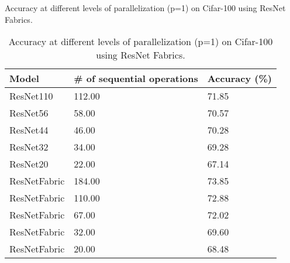\begin{table}[h]
\centering
\caption{Accuracy at different levels of parallelization (p=1) on Cifar-100 using ResNet Fabrics.}
\label{cif100_resnetfab_para1}
\begin{tabular}{|lll|}
\hline
Model        & \# of sequential operations & Accuracy (\%) \\ \hline \hline
ResNet110    & 112.00                      & 71.85         \\
ResNet56     & 58.00                       & 70.57         \\
ResNet44     & 46.00                       & 70.28         \\
ResNet32     & 34.00                       & 69.28         \\
ResNet20     & 22.00                       & 67.14         \\ \hline
ResNetFabric & 184.00                      & 73.85         \\
ResNetFabric & 110.00                      & 72.88         \\
ResNetFabric & 67.00                       & 72.02         \\
ResNetFabric & 32.00                       & 69.60         \\
ResNetFabric & 20.00                       & 68.48         \\ \hline
\end{tabular}
\caption{Accuracy at different levels of parallelization (p=1) on Cifar-100 using ResNet Fabrics.}
\label{cif100_resnetfab_para1}
\end{table}